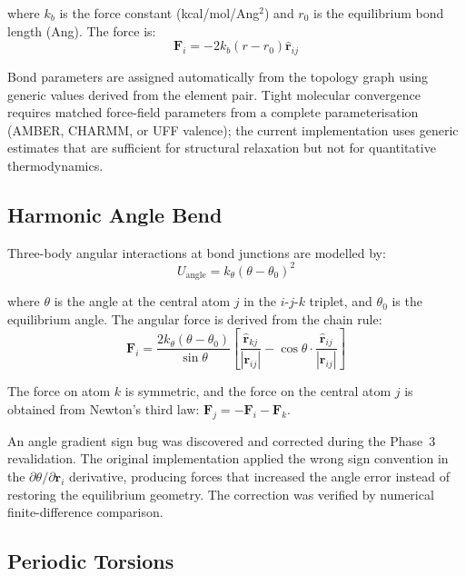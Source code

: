 \documentclass[11pt,twoside]{article}
\def\AA{Ang}%
\begin{document}
where $k_b$ is the force constant (kcal/mol/\AA$^2$) and $r_0$ is the equilibrium bond length (\AA). The force is:
\begin{equation}
  \mathbf{F}_i = -2k_b(r - r_0) \hat{\mathbf{r}}_{ij}
  \label{eq:bond-force}
\end{equation}

Bond parameters are assigned automatically from the topology graph using generic values derived from the element pair. Tight molecular convergence requires matched force-field parameters from a complete parameterisation (AMBER, CHARMM, or UFF valence); the current implementation uses generic estimates that are sufficient for structural relaxation but not for quantitative thermodynamics.

\subsection{Harmonic Angle Bend}

Three-body angular interactions at bond junctions are modelled by:
\begin{equation}
  U_{\mathrm{angle}} = k_\theta (\theta - \theta_0)^2
  \label{eq:angle}
\end{equation}

where $\theta$ is the angle at the central atom $j$ in the $i$-$j$-$k$ triplet, and $\theta_0$ is the equilibrium angle. The angular force is derived from the chain rule:
\begin{equation}
  \mathbf{F}_i = \frac{2k_\theta(\theta - \theta_0)}{\sin\theta}
    \left[\frac{\hat{\mathbf{r}}_{kj}}{|\mathbf{r}_{ij}|} - \cos\theta \cdot \frac{\hat{\mathbf{r}}_{ij}}{|\mathbf{r}_{ij}|}\right]
  \label{eq:angle-force}
\end{equation}

The force on atom $k$ is symmetric, and the force on the central atom $j$ is obtained from Newton's third law: $\mathbf{F}_j = -\mathbf{F}_i - \mathbf{F}_k$.

An angle gradient sign bug was discovered and corrected during the Phase~3 revalidation. The original implementation applied the wrong sign convention in the $\partial\theta/\partial\mathbf{r}_i$ derivative, producing forces that increased the angle error instead of restoring the equilibrium geometry. The correction was verified by numerical finite-difference comparison.

\subsection{Periodic Torsions}
\end{document}
